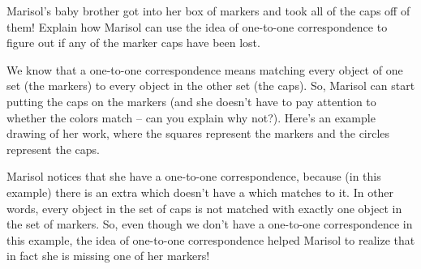 \documentclass{ximera}
\begin{document}
\begin{example}
Marisol's baby brother got into her box of markers and took all of the caps off of them! Explain how Marisol can  use the idea of one-to-one correspondence to figure out if any of the marker caps have been lost. 


\begin{explanation} 
We know that a one-to-one correspondence means matching every object of one set (the markers) to every object in the other set (the caps). So, Marisol can start putting the caps on the markers (and she doesn't have to pay attention to whether the colors match -- can you explain why not?). Here's an example drawing of her work, where the squares represent the markers and the circles represent the caps.
\begin{center}
\end{center}
Marisol notices that she  have a one-to-one correspondence, because (in this example) there is an extra  which doesn't have a  which matches to it. In other words, every object in the set of caps is not matched with exactly one object in the set of markers. So, even though we don't have a one-to-one correspondence in this example, the idea of one-to-one correspondence helped Marisol to realize that in fact she is missing one of her markers!
\end{explanation}
\end{example}
\end{document}

